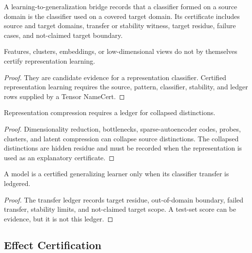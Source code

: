 \begin{definition}
\label{def:philosophy-learning-generalization-bridge}
A learning-to-generalization bridge records that a classifier formed on
a source domain is the classifier used on a covered target domain. Its
certificate includes source and target domains, transfer or stability
witness, target residue, failure cases, and not-claimed target boundary.
\end{definition}

\begin{theorem}
\label{thm:philosophy-representation-learning-requires-tensor-namecert}
Features, clusters, embeddings, or low-dimensional views do not by
themselves certify representation learning.
\end{theorem}
\begin{proof}
They are candidate evidence for a representation classifier. Certified
representation learning requires the source, pattern, classifier,
stability, and ledger rows supplied by a Tensor NameCert.
\end{proof}

\begin{theorem}
\label{thm:philosophy-representation-compression-requires-ledger}
Representation compression requires a ledger for collapsed distinctions.
\end{theorem}
\begin{proof}
Dimensionality reduction, bottlenecks, sparse-autoencoder codes, probes,
clusters, and latent compression can collapse source distinctions. The
collapsed distinctions are hidden residue and must be recorded when the
representation is used as an explanatory certificate.
\end{proof}

\begin{theorem}
\label{thm:philosophy-certified-generalizing-learner-transfer-ledger}
A model is a certified generalizing learner only when its classifier
transfer is ledgered.
\end{theorem}
\begin{proof}
The transfer ledger records target residue, out-of-domain boundary,
failed transfer, stability limits, and not-claimed target scope. A
test-set score can be evidence, but it is not this ledger.
\end{proof}

\subsection{Effect Certification}
\label{subsec:philosophy-learning-effect-certification}

